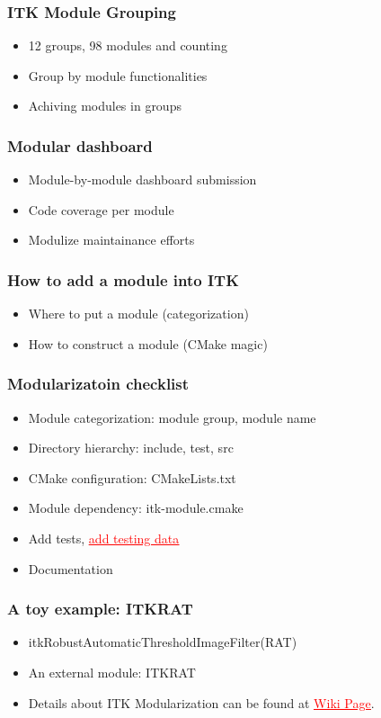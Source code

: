 \begin{frame}
\frametitle{ITK Module Grouping}
\begin{itemize}
\item  12 groups, 98 modules and counting
\pause
\item  Group by module functionalities
\pause
\item  Achiving modules in groups
\pause
\end{itemize}
\end{frame}



\begin{frame}
\frametitle{Modular dashboard }
\begin{itemize}
\item  Module-by-module dashboard submission
\pause
\item  Code coverage per module
\pause
\item  Modulize  maintainance efforts
\end{itemize}
\end{frame}


\begin{frame}
\frametitle{How to add a module into ITK}
\begin{itemize}
\item Where to put a module (categorization)
\pause
\item How to construct a module (CMake magic)
\end{itemize}
\end{frame}


\begin{frame}
\frametitle{Modularizatoin checklist}
\begin{itemize}
\item  Module categorization: module group, module name
\pause
\item  Directory hierarchy: include, test, src
\pause
\item  CMake configuration: CMakeLists.txt
\pause
\item  Module dependency: itk-module.cmake
\pause
\item  Add tests, \href{http://www.vtk.org/Wiki/ITK/Git/Develop/Data\#Workflow}{\textcolor{red}{\underline{add testing data}}}
\pause
\item  Documentation
\end{itemize}
\end{frame}


\begin{frame}
\frametitle{A toy example: ITKRAT}
\begin{itemize}
\item  itkRobustAutomaticThresholdImageFilter(RAT)
\pause
\item  An external module: ITKRAT
\end{itemize}
\end{frame}


\begin{frame}
\begin{itemize}
\item  Details about ITK Modularization can be found at \href{http://www.itk.org/Wiki/ITK\_Release\_4/Modularization}{\textcolor{red}{\underline{Wiki Page}}}.
\end{itemize}
\end{frame}

